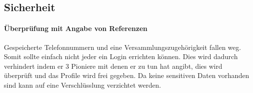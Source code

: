 \subsection{Sicherheit}
\paragraph{Überprüfung mit Angabe von Referenzen} Gespeicherte Telefonnummern und eine Versammlungszugehörigkeit fallen weg. Somit sollte einfach nicht jeder ein Login errichten können. Dies wird dadurch verhindert indem er 3 Pioniere mit denen er zu tun hat angibt, dies wird überprüft und das Profile wird frei gegeben. Da keine sensitiven Daten vorhanden sind kann auf eine Verschlüsslung verzichtet werden.